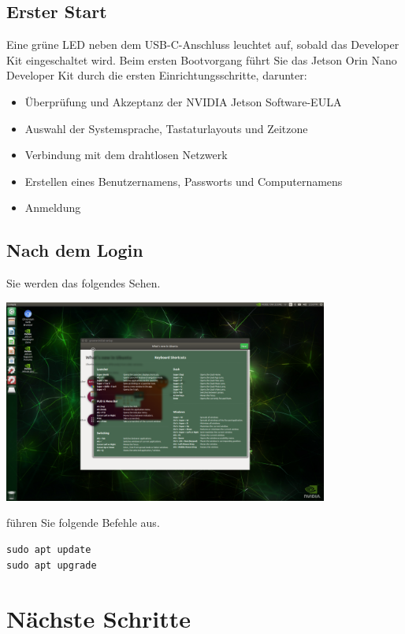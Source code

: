 \documentclass{article}
\begin{document}
\subsection{Erster Start}
Eine grüne LED neben dem USB-C-Anschluss leuchtet auf, sobald das Developer Kit eingeschaltet wird. 
Beim ersten Bootvorgang führt Sie das Jetson Orin Nano Developer Kit durch die ersten Einrichtungsschritte, darunter:

\begin{itemize}
    \item Überprüfung und Akzeptanz der NVIDIA Jetson Software-EULA
    \item Auswahl der Systemsprache, Tastaturlayouts und Zeitzone
    \item Verbindung mit dem drahtlosen Netzwerk
    \item Erstellen eines Benutzernamens, Passworts und Computernamens
    \item Anmeldung
\end{itemize}

\subsection{Nach dem Login}
Sie werden das folgendes Sehen.

\begin{center}
    \includegraphics[width=0.8\textwidth ]{jetson_booted_screen.png}
\end{center}
\par \bigskip 

führen Sie folgende Befehle aus. 
\begin{verbatim}
sudo apt update
sudo apt upgrade
\end{verbatim}
\clearpage
\section{Nächste Schritte}
\end{document}
